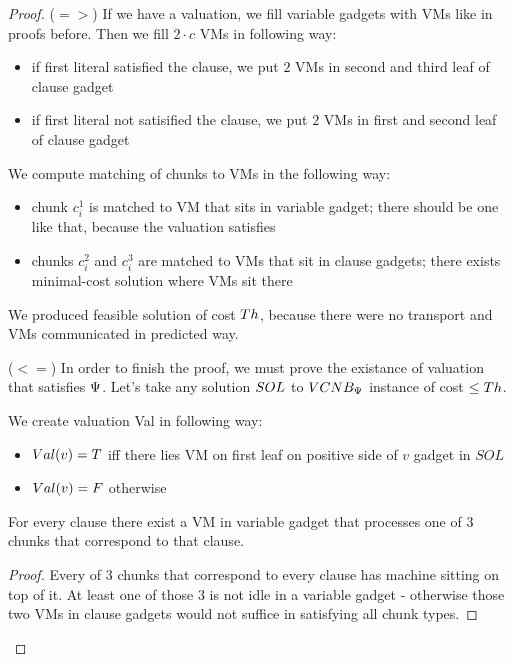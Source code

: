 \begin{proof}
($=>$) If we have a valuation, we fill variable gadgets with VMs like in
proofs before. Then we fill $2 \cdot c$ VMs in following way:

\begin{itemize}
\item if first literal satisfied the clause, we put $2$ VMs in second and
third leaf of clause gadget
\item if first literal not satisified the clause, we put $2$ VMs in first
and second leaf of clause gadget
\end{itemize}

We compute matching of chunks to VMs in the following way:
\begin{itemize}
\item chunk $c_i^1$ is matched to VM that sits in variable gadget; there
should be one like that, because the valuation satisfies
\item chunks $c_i^2$ and $c_i^3$ are matched to VMs that sit in clause
gadgets; there exists minimal-cost solution where VMs sit there
\end{itemize}

We produced feasible solution of cost $Th$, because there were no
transport and VMs communicated in predicted way.

($<=$) In order to finish the proof, we must prove the existance of
valuation that satisfies $\Psi$.
Let's take any solution $SOL$ to $VCNB_{\Psi}$ instance of cost $\leq Th$.

We create valuation Val in following way:
\begin{itemize}
\item $Val(v) = T$ iff there lies VM on first leaf on positive side of $v$ gadget in $SOL$
\item $Val(v) = F$ otherwise
\end{itemize}

\begin{lemma}For every clause there exist a VM in variable gadget that processes one of
  3 chunks that correspond to that clause.
\end{lemma}
\begin{proof}
 Every of $3$ chunks that correspond to every clause has machine sitting
on top of it. At least one of those $3$ is not idle in a variable gadget
- otherwise those two VMs in clause gadgets would not suffice in
satisfying all chunk types.\end{proof}


\end{proof}

